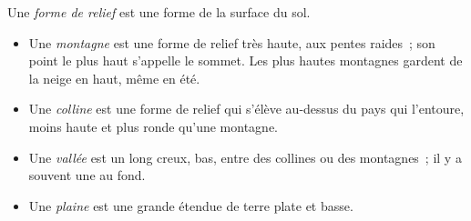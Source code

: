 \begin{definition}\label{def:g1:landscapes-around-us:landform}
Une \emph{forme de relief} est une forme de la
surface du sol.
\begin{itemize}
  \item Une \emph{montagne} est une forme de relief très
        haute, aux pentes raides~; son point le plus haut s'appelle le
        sommet. Les plus hautes montagnes gardent de la neige en haut,
        même en été.
  \item Une \emph{colline} est une forme de relief qui
        s'élève au-dessus du pays qui l'entoure, moins haute et plus ronde
        qu'une montagne.
  \item Une \emph{vallée} est un long creux, bas,
        entre des collines ou des montagnes~; il y a souvent une  au
        fond.
  \item Une \emph{plaine} est une grande étendue de terre
        plate et basse.
\end{itemize}
\end{definition}

